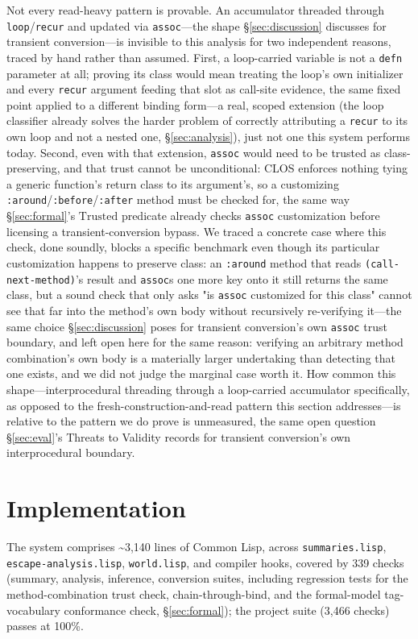 \documentclass[sigplan,review,anonymous]{acmart}
\begin{document}
Not every read-heavy pattern is provable. An accumulator threaded through \texttt{loop}/\texttt{recur} and updated via \texttt{assoc}---the shape \S\ref{sec:discussion} discusses for transient conversion---is invisible to this analysis for two independent reasons, traced by hand rather than assumed. First, a loop-carried variable is not a \texttt{defn} parameter at all; proving its class would mean treating the loop's own initializer and every \texttt{recur} argument feeding that slot as call-site evidence, the same fixed point applied to a different binding form---a real, scoped extension (the loop classifier already solves the harder problem of correctly attributing a \texttt{recur} to its own loop and not a nested one, §\ref{sec:analysis}), just not one this system performs today. Second, even with that extension, \texttt{assoc} would need to be trusted as class-preserving, and that trust cannot be unconditional: CLOS enforces nothing tying a generic function's return class to its argument's, so a customizing \texttt{:around}/\texttt{:before}/\texttt{:after} method must be checked for, the same way \S\ref{sec:formal}'s $\mathrm{Trusted}$ predicate already checks \texttt{assoc} customization before licensing a transient-conversion bypass. We traced a concrete case where this check, done soundly, blocks a specific benchmark even though its particular customization happens to preserve class: an \texttt{:around} method that reads \texttt{(call-next-method)}'s result and \texttt{assoc}s one more key onto it still returns the same class, but a sound check that only asks "is \texttt{assoc} customized for this class" cannot see that far into the method's own body without recursively re-verifying it---the same choice \S\ref{sec:discussion} poses for transient conversion's own \texttt{assoc} trust boundary, and left open here for the same reason: verifying an arbitrary method combination's own body is a materially larger undertaking than detecting that one exists, and we did not judge the marginal case worth it. How common this shape---interprocedural threading through a loop-carried accumulator specifically, as opposed to the fresh-construction-and-read pattern this section addresses---is relative to the pattern we do prove is unmeasured, the same open question \S\ref{sec:eval}'s Threats to Validity records for transient conversion's own interprocedural boundary.

\section{Implementation}
\label{sec:implementation}
The system comprises \textasciitilde3,140 lines of Common Lisp, across \texttt{summaries.lisp}, \texttt{escape-analysis.lisp}, \texttt{world.lisp}, and compiler hooks, covered by 339 checks (summary, analysis, inference, conversion suites, including regression tests for the method-combination trust check, chain-through-bind, and the formal-model tag-vocabulary conformance check, §\ref{sec:formal}); the project suite (3,466 checks) passes at 100\%.
\end{document}
